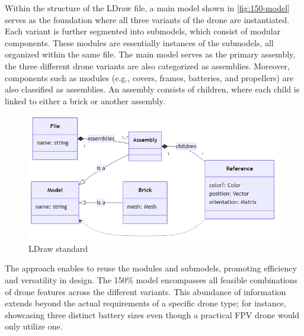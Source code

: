 \documentclass[sigconf,review]{acmart}
\begin{document}
Within the structure of the LDraw file, a main model shown in \cref{fig:150-model} serves as the foundation where all three variants of the drone are instantiated. 
Each variant is further segmented into submodels, which consist of modular components. 
These modules are essentially instances of the submodels, all organized within the same file.
The main model serves as the primary assembly, the three different drone variants are also categorized as assemblies. 
Moreover, components such as modules (e.g., covers, frames, batteries, and propellers) are also classified as assemblies. 
An assembly consists of children, where each child is linked to either a brick or another assembly. 



\begin{figure}[htbp]
    \includegraphics[width=\columnwidth]{./ldraw-standard.png}
    \caption{LDraw standard}
    \label{fig:ldraw-standard}
\end{figure}

The approach enables to reuse the modules and submodels, promoting efficiency and versatility in design. 
The 150\% model encompasses all feasible combinations of drone features across the different variants. 
This abundance of information extends beyond the actual requirements of a specific drone type; for instance, showcasing three distinct battery sizes even though a practical FPV drone would only utilize one.

\end{document}
